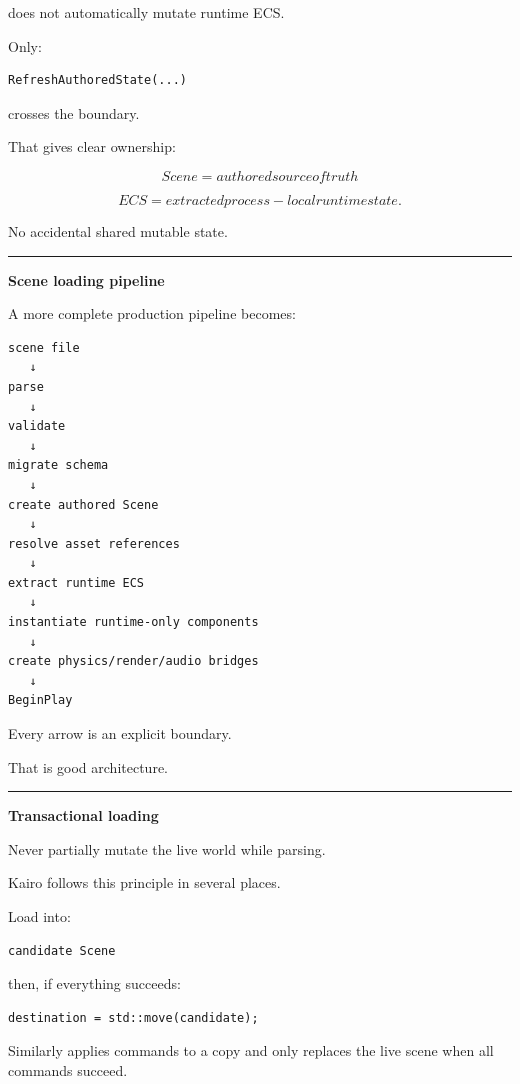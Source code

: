 does not automatically mutate runtime ECS.

Only:

\begin{verbatim}
RefreshAuthoredState(...)
\end{verbatim}

crosses the boundary.

That gives clear ownership:

\[
\boxed{
Scene = authored source of truth
}
\]

\[
\boxed{
ECS = extracted process-local runtime state.
}
\]

No accidental shared mutable state.

\begin{center}\rule{0.5\linewidth}{0.5pt}\end{center}

\textbf{Scene loading pipeline}

A more complete production pipeline becomes:

\begin{verbatim}
scene file
   ↓
parse
   ↓
validate
   ↓
migrate schema
   ↓
create authored Scene
   ↓
resolve asset references
   ↓
extract runtime ECS
   ↓
instantiate runtime-only components
   ↓
create physics/render/audio bridges
   ↓
BeginPlay
\end{verbatim}

Every arrow is an explicit boundary.

That is good architecture.

\begin{center}\rule{0.5\linewidth}{0.5pt}\end{center}

\textbf{Transactional loading}

Never partially mutate the live world while parsing.

Kairo follows this principle in several places.

Load into:

\begin{verbatim}
candidate Scene
\end{verbatim}

then, if everything succeeds:

\begin{verbatim}
destination = std::move(candidate);
\end{verbatim}

Similarly  applies commands to a copy and only replaces the live scene when all commands succeed.

